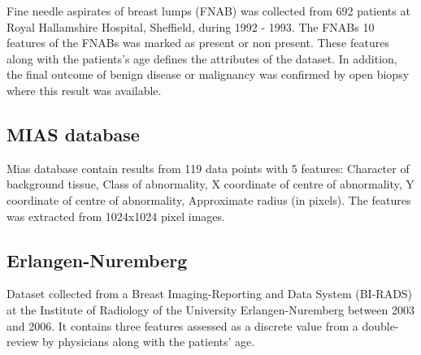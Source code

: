 Fine needle aspirates of breast lumps (FNAB) was collected from 692 patients at Royal Hallamshire Hospital, Sheffield, during 1992 - 1993. The FNABs 10 features of the FNABs was marked as present or non present. These features along with the patients's age defines the attributes of the dataset. In addition, the final outcome of benign disease or malignancy was confirmed by open biopsy where this result was available.

\subsection{MIAS database}

Mias database contain results from 119 data points with 5 features: Character of background tissue, Class of abnormality, X coordinate of centre of abnormality, Y coordinate of centre of abnormality, Approximate radius (in pixels). The features was extracted from 1024x1024 pixel images.

%

\subsection{Erlangen-Nuremberg}

Dataset collected from a Breast Imaging-Reporting and Data System (BI-RADS) at the Institute of Radiology of the University Erlangen-Nuremberg between 2003 and 2006. It contains three features assessed as a discrete value from a double-review by physicians along with the patients' age.

